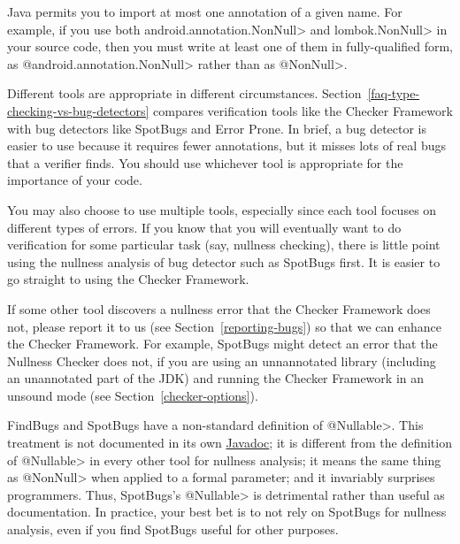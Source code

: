 Java permits you to import at most one annotation of a given name.  For
example, if you use both \<android.annotation.NonNull> and
\<lombok.NonNull> in your source code, then you must write at least one of
them in fully-qualified form, as \<@android.annotation.NonNull> rather than
as \<@NonNull>.



Different tools are appropriate in different circumstances.
Section~\ref{faq-type-checking-vs-bug-detectors} compares verification
tools like the Checker Framework with bug detectors like SpotBugs and Error
Prone.  In brief, a bug detector is easier to use because it requires fewer
annotations, but it misses lots of real bugs that a verifier finds.  You
should use whichever tool is appropriate for the importance of your code.

You may also choose to use multiple tools, especially since each tool
focuses on different types of errors.  If you know that you will eventually
want to do verification for some particular task (say, nullness checking),
there is little point using the nullness analysis of bug detector such as
SpotBugs first.  It is easier to go straight to using the
Checker Framework.

If some other tool discovers a nullness error that the Checker
Framework does not, please report it to us (see
Section~\ref{reporting-bugs}) so that we can enhance the Checker Framework.
For example, SpotBugs might detect an error that the Nullness Checker does
not, if you are using an unnannotated library (including an unannotated
part of the JDK) and running the Checker Framework in an unsound mode (see
Section~\ref{checker-options}).



FindBugs and SpotBugs have a non-standard definition of
\<@Nullable>.  This treatment is not documented in its own
\href{https://www.javadoc.io/doc/com.github.spotbugs/spotbugs-annotations/latest/edu/umd/cs/findbugs/annotations/Nullable.html}{Javadoc};
it is different from the definition of \<@Nullable> in every other tool for
nullness analysis; it means the same thing as \<@NonNull> when applied to a
formal parameter; and it invariably surprises programmers.  Thus, SpotBugs's
\<@Nullable> is detrimental rather than useful as documentation.
In practice, your best bet is to not rely on SpotBugs for nullness analysis,
even if you find SpotBugs useful for other purposes.

